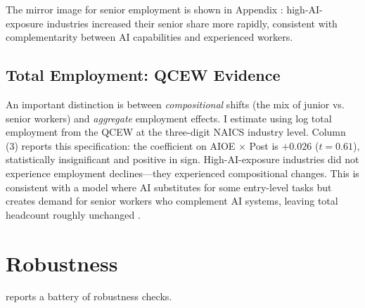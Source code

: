 \documentclass[12pt]{article}
\begin{document}
The mirror image for senior employment is shown in Appendix : high-AI-exposure industries increased their senior share more rapidly, consistent with complementarity between AI capabilities and experienced workers.

\subsection{Total Employment: QCEW Evidence}

An important distinction is between \emph{compositional} shifts (the mix of junior vs. senior workers) and \emph{aggregate} employment effects. I estimate  using log total employment from the QCEW at the three-digit NAICS industry level.  Column (3) reports this specification: the coefficient on AIOE $\times$ Post is $+0.026$ ($t = 0.61$), statistically insignificant and positive in sign. High-AI-exposure industries did not experience employment declines---they experienced compositional changes. This is consistent with a model where AI substitutes for some entry-level tasks but creates demand for senior workers who complement AI systems, leaving total headcount roughly unchanged \citep{acemoglu2019}.


\section{Robustness}

 reports a battery of robustness checks.
\end{document}
